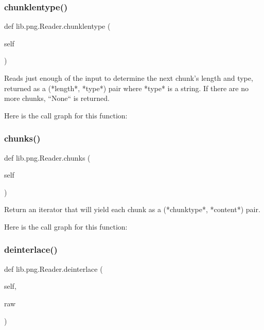 \subsubsection{\texorpdfstring{chunklentype()}{chunklentype()}}
{\footnotesize\ttfamily def lib.\+png.\+Reader.\+chunklentype (\begin{DoxyParamCaption}\item[{}]{self }\end{DoxyParamCaption})}

\begin{DoxyVerb}Reads just enough of the input to determine the next
chunk's length and type, returned as a (*length*, *type*) pair
where *type* is a string.  If there are no more chunks, ``None``
is returned.
\end{DoxyVerb}
 Here is the call graph for this function\+:
\mbox{\label{classlib_1_1png_1_1_reader_aed162ed2796599df4983036954a5e077}} 
\subsubsection{\texorpdfstring{chunks()}{chunks()}}
{\footnotesize\ttfamily def lib.\+png.\+Reader.\+chunks (\begin{DoxyParamCaption}\item[{}]{self }\end{DoxyParamCaption})}

\begin{DoxyVerb}Return an iterator that will yield each chunk as a
(*chunktype*, *content*) pair.
\end{DoxyVerb}
 Here is the call graph for this function\+:
\mbox{\label{classlib_1_1png_1_1_reader_a19ec9a186e3fdf3a57601b3450ee0f5e}} 
\subsubsection{\texorpdfstring{deinterlace()}{deinterlace()}}
{\footnotesize\ttfamily def lib.\+png.\+Reader.\+deinterlace (\begin{DoxyParamCaption}\item[{}]{self,  }\item[{}]{raw }\end{DoxyParamCaption})}

